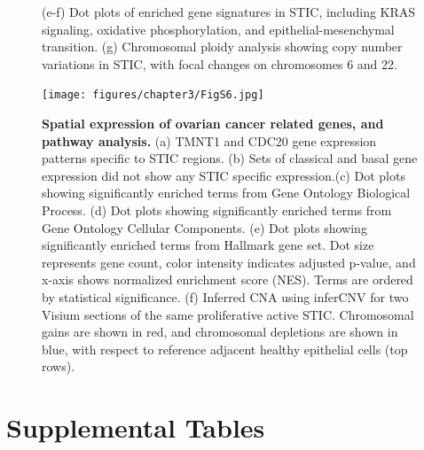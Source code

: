 \begin{refsection}
    \begin{figure}[h!]
        \ContinuedFloat
        \captionsetup{font=small}
        \caption[]{(e-f) Dot plots of enriched gene signatures in STIC, including KRAS signaling, oxidative phosphorylation, and epithelial-mesenchymal transition. (g) Chromosomal ploidy analysis showing copy number variations in STIC, with focal changes on chromosomes 6 and 22.}
    \end{figure}

    \begin{figure}[p]
        \begin{center}
            \texttt{[image: figures/chapter3/FigS6.jpg]}
            \captionsetup{font=small}
            \caption{ \textbf{Spatial expression of ovarian cancer related genes, and pathway analysis.} (a)  TMNT1 and CDC20 gene expression patterns specific to STIC regions. (b) Sets of classical and basal gene expression did not show any STIC specific expression.(c) Dot plots showing significantly enriched terms from Gene Ontology Biological Process. (d) Dot plots showing significantly enriched terms from Gene Ontology Cellular Components. (e) Dot plots showing significantly enriched terms from Hallmark gene set. Dot size represents gene count, color intensity indicates adjusted p-value, and x-axis shows normalized enrichment score (NES). Terms are ordered by statistical significance. (f) Inferred CNA using inferCNV for two Visium sections of the same proliferative active STIC. Chromosomal gains are shown in red, and chromosomal depletions are shown in blue, with respect to reference adjacent healthy epithelial cells (top rows).}
            \label{chapter3_figS6}
        \end{center}
    \end{figure}
    
    \clearpage 
    
    \section{Supplemental Tables}
    

\end{refsection}

